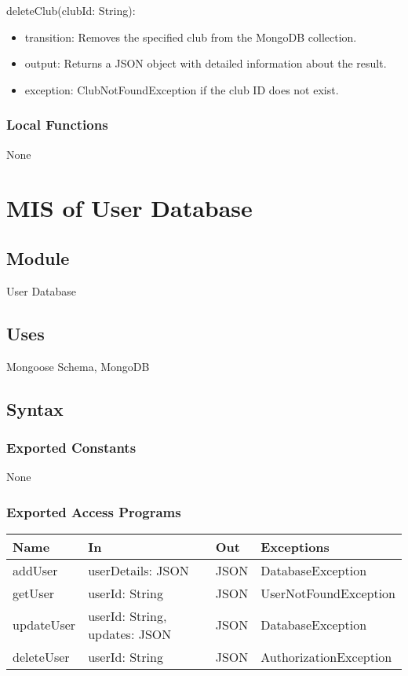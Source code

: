 \documentclass[12pt, titlepage]{article}
\begin{document}
\noindent deleteClub(clubId: String):
\begin{itemize}
  \item transition: Removes the specified club from the MongoDB collection.
  \item output: Returns a JSON object with detailed information about the result.
  \item exception: ClubNotFoundException if the club ID does not exist.
\end{itemize}

\subsubsection{Local Functions}
None

\section{MIS of User Database} \label{User Database}

\subsection{Module}
User Database

\subsection{Uses}
Mongoose Schema, MongoDB

\subsection{Syntax}

\subsubsection{Exported Constants}
None

\subsubsection{Exported Access Programs}

\begin{center}
\begin{tabular}{p{2cm} p{4cm} p{2cm} p{4cm}}
\hline
\textbf{Name} & \textbf{In} & \textbf{Out} & \textbf{Exceptions} \\
\hline
addUser & userDetails: JSON & JSON & DatabaseException \\
getUser & userId: String & JSON & UserNotFoundException \\
updateUser & userId: String, updates: JSON & JSON & DatabaseException \\
deleteUser & userId: String & JSON & AuthorizationException \\
\hline
\end{tabular}
\end{center}
\end{document}
